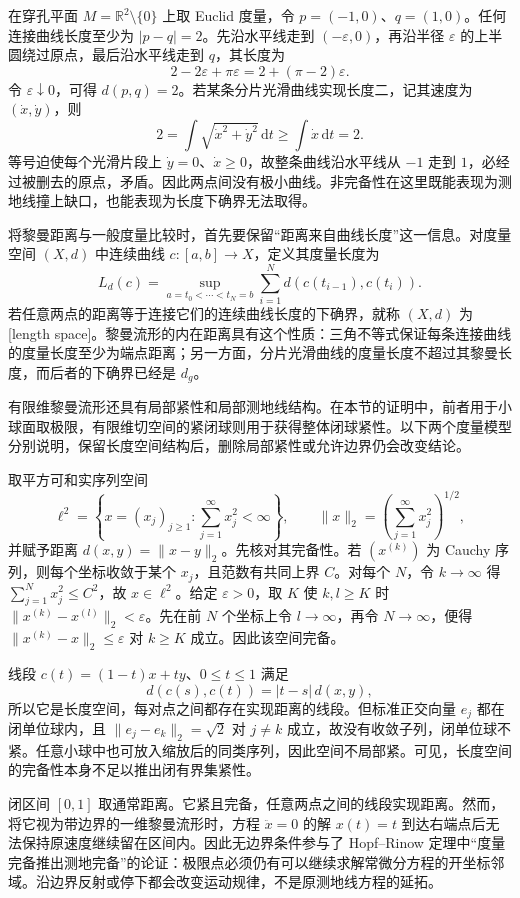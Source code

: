 \begin{example}\label{g3:exm:punctured-plane-no-minimizer}
	在穿孔平面 \(M=\mathbb R^2\setminus\{0\}\) 上取 Euclid 度量，令 \(p=(-1,0)\)、\(q=(1,0)\)。任何连接曲线长度至少为 \(|p-q|=2\)。先沿水平线走到 \((-\varepsilon,0)\)，再沿半径 \(\varepsilon\) 的上半圆绕过原点，最后沿水平线走到 \(q\)，其长度为
	\[
		2-2\varepsilon+\pi\varepsilon=2+(\pi-2)\varepsilon.
	\]
	令 \(\varepsilon\downarrow0\)，可得 \(d(p,q)=2\)。若某条分片光滑曲线实现长度二，记其速度为 \((\dot x,\dot y)\)，则
	\[
		2=\int\sqrt{\dot x^2+\dot y^2}\,\mathrm dt
		\ge\int\dot x\,\mathrm dt=2.
	\]
	等号迫使每个光滑片段上 \(\dot y=0\)、\(\dot x\ge0\)，故整条曲线沿水平线从 \(-1\) 走到 \(1\)，必经过被删去的原点，矛盾。因此两点间没有极小曲线。非完备性在这里既能表现为测地线撞上缺口，也能表现为长度下确界无法取得。
\end{example}

将黎曼距离与一般度量比较时，首先要保留“距离来自曲线长度”这一信息。对度量空间 \((X,d)\) 中连续曲线 \(c:[a,b]\rightarrow X\)，定义其度量长度为
\[
	L_d(c)=\sup_{a=t_0<\cdots<t_N=b}
	\sum_{i=1}^N d(c(t_{i-1}),c(t_i)).
\]
若任意两点的距离等于连接它们的连续曲线长度的下确界，就称 \((X,d)\) 为[length space]。黎曼流形的内在距离具有这个性质：三角不等式保证每条连接曲线的度量长度至少为端点距离；另一方面，分片光滑曲线的度量长度不超过其黎曼长度，而后者的下确界已经是 \(d_g\)。

\ProseParagraphBreak

有限维黎曼流形还具有局部紧性和局部测地线结构。在本节的证明中，前者用于小球面取极限，有限维切空间的紧闭球则用于获得整体闭球紧性。以下两个度量模型分别说明，保留长度空间结构后，删除局部紧性或允许边界仍会改变结论。

\begin{example}\label{g3:exm:hilbert-length-space}
	取平方可和实序列空间
	\[
		\ell^2=\left\{x=(x_j)_{j\ge1}:\sum_{j=1}^{\infty}x_j^2<\infty\right\},
		\qquad\|x\|_2=\left(\sum_{j=1}^{\infty}x_j^2\right)^{1/2},
	\]
	并赋予距离 \(d(x,y)=\|x-y\|_2\)。先核对其完备性。若 \((x^{(k)})\) 为 Cauchy 序列，则每个坐标收敛于某个 \(x_j\)，且范数有共同上界 \(C\)。对每个 \(N\)，令 \(k\rightarrow\infty\) 得 \(\sum_{j=1}^N x_j^2\le C^2\)，故 \(x\in\ell^2\)。给定 \(\varepsilon>0\)，取 \(K\) 使 \(k,l\ge K\) 时 \(\|x^{(k)}-x^{(l)}\|_2<\varepsilon\)。先在前 \(N\) 个坐标上令 \(l\rightarrow\infty\)，再令 \(N\rightarrow\infty\)，便得 \(\|x^{(k)}-x\|_2\le\varepsilon\) 对 \(k\ge K\) 成立。因此该空间完备。

	线段 \(c(t)=(1-t)x+ty\)、\(0\le t\le1\) 满足
	\[
		d(c(s),c(t))=|t-s|\,d(x,y),
	\]
	所以它是长度空间，每对点之间都存在实现距离的线段。但标准正交向量 \(e_j\) 都在闭单位球内，且 \(\|e_j-e_k\|_2=\sqrt2\) 对 \(j\ne k\) 成立，故没有收敛子列，闭单位球不紧。任意小球中也可放入缩放后的同类序列，因此空间不局部紧。可见，长度空间的完备性本身不足以推出闭有界集紧性。
\end{example}

\begin{example}\label{g3:exm:closed-interval-boundary}
	闭区间 \([0,1]\) 取通常距离。它紧且完备，任意两点之间的线段实现距离。然而，将它视为带边界的一维黎曼流形时，方程 \(\ddot x=0\) 的解 \(x(t)=t\) 到达右端点后无法保持原速度继续留在区间内。因此无边界条件参与了 Hopf--Rinow 定理中“度量完备推出测地完备”的论证：极限点必须仍有可以继续求解常微分方程的开坐标邻域。沿边界反射或停下都会改变运动规律，不是原测地线方程的延拓。
\end{example}
